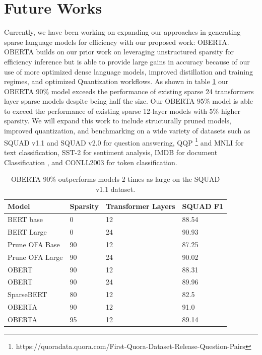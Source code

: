 \section{Future Works}
Currently, we have been working on expanding our approaches in generating sparse language models for efficiency with our proposed work: OBERTA. OBERTA builds on our prior work on leveraging unstructured sparsity for efficiency inference but is able to provide large gains in accuracy because of our use of more optimized dense language models, improved distillation and training regimes, and optimized Quantization workflows. As shown in table \ref{tab:OBERTA-squad} our OBERTA 90\% model exceeds the performance of existing sparse 24 transformers layer sparse models despite being half the size. Our OBERTA 95\% model is able to exceed the performance of existing sparse 12-layer models with 5\% higher sparsity. We will expand this work to include structurally pruned models, improved quantization, and benchmarking on a wide variety of datasets such as SQUAD v1.1 \cite{Rajpurkar2016SQuAD10} and SQUAD v2.0 \cite{Rajpurkar2018KnowWY} for question answering, QQP \footnote{https://quoradata.quora.com/First-Quora-Dataset-Release-Question-Pairs} and MNLI \cite{Williams2018ABC} for  text classification, SST-2 \cite{Socher2013RecursiveDM} for sentiment analysis, IMDB for document Classification \cite{Maas2011LearningWV}, and CONLL2003 \cite{Sang2003IntroductionTT} for token classification.
\begin{table}[!ht]
    \centering
    \begin{tabular}{|l|l|l|l|}
    \hline
        Model & Sparsity & Transformer Layers & SQUAD F1  \\ \hline
        BERT base & 0 & 12 & 88.54  \\ \hline
        BERT Large & 0 & 24 & 90.93   \\ \hline
        Prune OFA Base & 90 & 12 & 87.25  \\ \hline
        Prune OFA Large & 90 & 24 & 90.02\\ \hline
        OBERT & 90 & 12 & 88.31 \\ \hline
        OBERT & 90 & 24 & 89.96  \\ \hline
        SparseBERT & 80 & 12 & 82.5  \\ \hline
        OBERTA & 90 & 12 & 91.0 \\ \hline
        OBERTA & 95 & 12 & 89.14  \\ \hline
    \end{tabular}
    \caption{OBERTA 90\% outperforms models 2 times as large on the SQUAD v1.1 dataset.}
    \label{tab:OBERTA-squad}
\end{table}